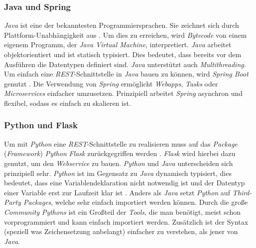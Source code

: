 		\subsubsection{Java und Spring}
		\textit{Java} ist eine der bekanntesten Programmiersprachen. Sie zeichnet sich durch Plattform-Unabhängigkeit aus \cite{jdkDocs}. Um dies zu erreichen, wird \textit{Bytecode} von einem eigenem Programm, der \textit{Java Virtual Machine}, interpretiert. \textit{Java} arbeitet objektorientiert und ist statisch typisiert. Dies bedeutet, dass bereits vor dem Ausführen die Datentypen definiert sind. \textit{Java} unterstützt auch \textit{Multithreading}. Um einfach eine \textit{REST}-Schnittstelle in \textit{Java} bauen zu können, wird \textit{Spring Boot} genutzt \cite{springDocs}. Die Verwendung von \textit{Spring} ermöglicht \textit{Webapps}, \textit{Tasks} oder \textit{Microservices} einfacher umzusetzen. Prinzipiell arbeitet \textit{Spring} asynchron und flexibel, sodass es einfach zu skalieren ist. 
		
		\subsubsection{Python und Flask}
		Um mit \textit{Python} eine \textit{REST}-Schnittstelle zu realisieren muss auf das \textit{Package} (\textit{Framework}) \textit{Python} \textit{Flask} zurückgegriffen werden \cite{flaskDocs}. \textit{Flask} wird hierbei dazu genutzt, um den \textit{Webservice} zu bauen. \textit{Python} und \textit{Java} unterscheiden sich prinzipiell sehr. \textit{Python} ist im Gegensatz zu \textit{Java} dynamisch typisiert, dies bedeutet, dass eine Variablendeklaration nicht notwendig ist und der Datentyp einer Variable erst zur Laufzeit klar ist \cite{pythonDocs}. Anders als \textit{Java} setzt \textit{Python} auf \textit{Third-Party Packages}, welche sehr einfach importiert werden können. Durch die große \textit{Community} \textit{Pythons} ist ein Großteil der \textit{Tools}, die man benötigt, meist schon vorprogrammiert und kann einfach importiert werden. Zusätzlich ist der Syntax (speziell was Zeichensetzung anbelangt) einfacher zu verstehen, als jener von \textit{Java}.
		
